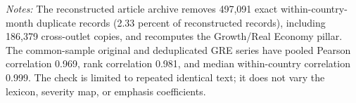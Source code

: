 \begin{table}[htbp]
\centering\small
\caption{Article-level exact-text deduplication sensitivity at the one-month horizon}
\label{tab:dedup_gre}
\vspace{0.35em}
\begin{minipage}{0.97\textwidth}\footnotesize\textit{Notes:} The reconstructed article archive removes 497,091 exact within-country-month duplicate records (2.33 percent of reconstructed records), including 186,379 cross-outlet copies, and recomputes the Growth/Real Economy pillar. The common-sample original and deduplicated GRE series have pooled Pearson correlation 0.969, rank correlation 0.981, and median within-country correlation 0.999. The check is limited to repeated identical text; it does not vary the lexicon, severity map, or emphasis coefficients.\end{minipage}
\end{table}
